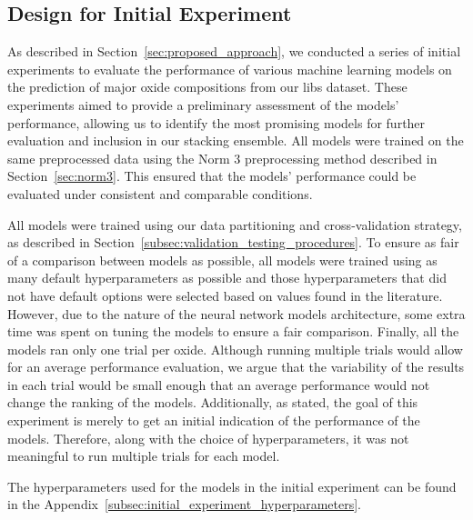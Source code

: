 \subsection{Design for Initial Experiment}\label{sec:initial-experiment}
As described in Section~\ref{sec:proposed_approach}, we conducted a series of initial experiments to evaluate the performance of various machine learning models on the prediction of major oxide compositions from our \gls{libs} dataset.
These experiments aimed to provide a preliminary assessment of the models' performance, allowing us to identify the most promising models for further evaluation and inclusion in our stacking ensemble.
All models were trained on the same preprocessed data using the Norm 3 preprocessing method described in Section~\ref{sec:norm3}.
This ensured that the models' performance could be evaluated under consistent and comparable conditions.

All models were trained using our data partitioning and cross-validation strategy, as described in Section~\ref{subsec:validation_testing_procedures}. 
To ensure as fair of a comparison between models as possible, all models were trained using as many default hyperparameters as possible and those hyperparameters that did not have default options were selected based on values found in the literature.
However, due to the nature of the neural network models architecture, some extra time was spent on tuning the models to ensure a fair comparison.
Finally, all the models ran only one trial per oxide. 
Although running multiple trials would allow for an average performance evaluation, we argue that the variability of the results in each trial would be small enough that an average performance would not change the ranking of the models. 
Additionally, as stated, the goal of this experiment is merely to get an initial indication of the performance of the models.
Therefore, along with the choice of hyperparameters, it was not meaningful to run multiple trials for each model.

The hyperparameters used for the models in the initial experiment can be found in the Appendix~\ref{subsec:initial_experiment_hyperparameters}.